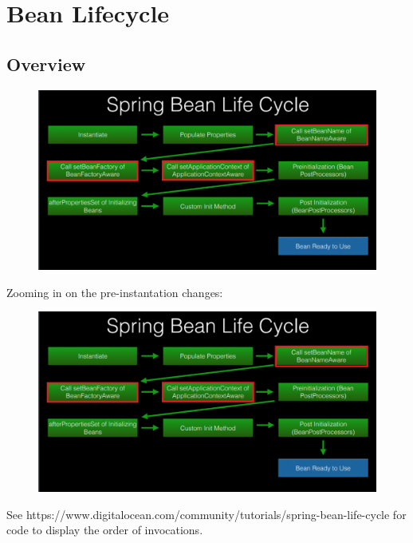 \documentclass{scrartcl}
\begin{document}
\section{Bean Lifecycle}
\subsection{Overview}

    \begin{figure}
        \centering
        \includegraphics[width=1\linewidth]{bean-lifecycle-1}
        \caption{}
        \label{fig:bean-lifecycle-1}
    \end{figure}

    Zooming in on the pre-instantation changes:

    \begin{figure}
        \centering
        \includegraphics[width=1\linewidth]{bean-lifecycle-1}
        \caption{}
        \label{fig:bean-lifecycle-2}
    \end{figure}

    See https://www.digitalocean.com/community/tutorials/spring-bean-life-cycle for code to display the order of invocations.
\end{document}
